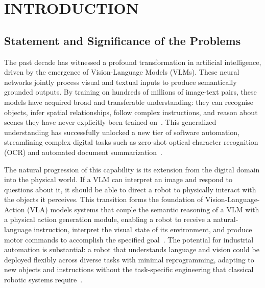 \chapter{INTRODUCTION}
\label{chap:introduction}

\section{Statement and Significance of the Problems}

The past decade has witnessed a profound transformation in artificial intelligence,
driven by the emergence of Vision-Language Models (VLMs). These neural networks jointly process
visual and textual inputs to produce semantically grounded outputs. By training on
hundreds of millions of image-text pairs, these models have acquired broad and
transferable understanding: they can recognise objects, infer spatial relationships,
follow complex instructions, and reason about scenes they have never explicitly been
trained on~\cite{openai2023gpt4v, liu2023llava, qwen3vl2025}. This generalized
understanding has successfully unlocked a new tier of software automation,
streamlining complex digital tasks such as zero-shot optical character recognition
(OCR) and automated document summarization~\cite{bai2025qwen25vl}.

The natural progression of this capability is its extension from the digital domain
into the physical world. If a VLM can interpret an image and respond to questions
about it, it should be able to direct a robot to physically interact with the objects
it perceives. This transition forms the foundation of Vision-Language-Action (VLA)
models  systems that couple the semantic reasoning of a VLM with a physical action
generation module, enabling a robot to receive a natural-language instruction,
interpret the visual state of its environment, and produce motor commands to
accomplish the specified goal~\cite{brohan2023rt2, driess2023palme}. The potential
for industrial automation is substantial: a robot that understands language and
vision could be deployed flexibly across diverse tasks with minimal reprogramming,
adapting to new objects and instructions without the task-specific engineering that
classical robotic systems require~\cite{lavalle2006planning}.

